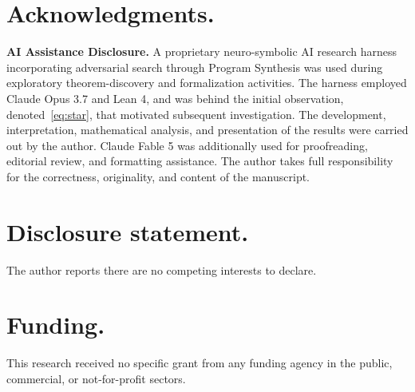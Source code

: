 \documentclass{article}
\theoremstyle{plain}
\theoremstyle{definition}
\begin{document}
\section*{Acknowledgments.}

\textbf{AI Assistance Disclosure.} A proprietary neuro-symbolic AI research
harness incorporating adversarial search through Program Synthesis was used during
exploratory theorem-discovery and formalization activities. The harness employed
Claude Opus 3.7 and Lean 4, and was behind the initial observation, denoted~\eqref{eq:star}, that
motivated subsequent investigation. The development, interpretation,
mathematical analysis, and presentation of the results were carried out by the
author. Claude Fable 5 was additionally used for proofreading, editorial
review, and formatting assistance. The author takes full responsibility for the
correctness, originality, and content of the manuscript.

\section*{Disclosure statement.}

The author reports there are no competing interests to declare.

\section*{Funding.}

This research received no specific grant from any funding agency in the
public, commercial, or not-for-profit sectors.



\end{document}
